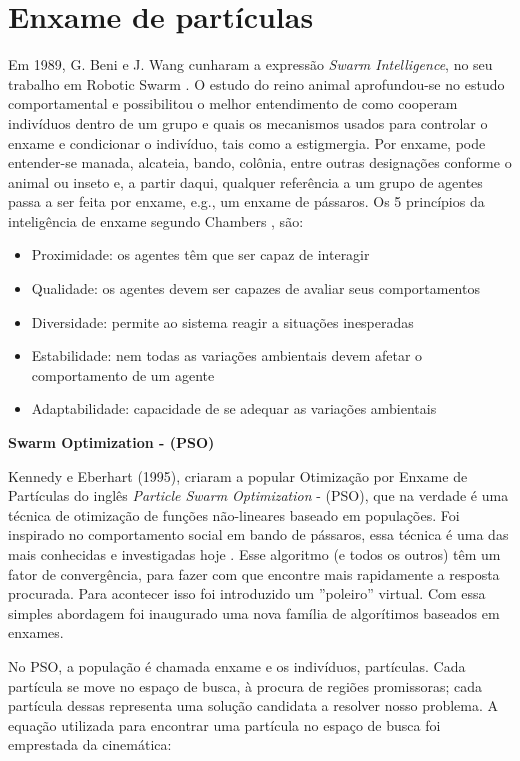 \documentclass[conference,compsoc]{IEEEtran}
\begin{document}
\section{Enxame de partículas}\label{arte:enxames}

Em 1989, G. Beni e J. Wang cunharam a expressão \textit{Swarm Intelligence}, no seu
trabalho em Robotic Swarm \cite{SRobotics}. O estudo do reino animal aprofundou-se no estudo
comportamental e possibilitou o melhor entendimento de como cooperam indivíduos dentro de um grupo e
quais os mecanismos usados para controlar o enxame e condicionar o indivíduo, tais como a estigmergia. 
Por enxame, pode entender-se manada, alcateia, bando, colônia, entre outras designações conforme o animal 
ou inseto e, a partir daqui, qualquer referência a um grupo de agentes passa a ser feita por enxame, e.g., 
um enxame de pássaros. Os 5 princípios da inteligência de enxame segundo  Chambers \cite{chambers2014computer}, são:
\begin{itemize}
	\item{Proximidade: os agentes têm que ser capaz de interagir}
	\item{Qualidade: os agentes devem ser capazes de avaliar seus comportamentos}
	\item{Diversidade: permite ao sistema reagir a situações inesperadas}
	\item{Estabilidade: nem todas as variações ambientais devem afetar o comportamento de um agente}
	\item{Adaptabilidade: capacidade de se adequar as variações ambientais}
\end{itemize}

\vspace{0.3cm}
\textbf{Swarm Optimization - (PSO)}
\vspace{0.1cm}

Kennedy e Eberhart (1995), criaram a popular Otimização por Enxame de Partículas do inglês \textit{Particle Swarm Optimization} - (PSO), 
que na verdade é uma técnica de otimização de funções não-lineares baseado em populações. Foi inspirado no comportamento
social em bando de pássaros, essa técnica é uma das mais conhecidas e investigadas hoje \cite{Kennedy1995}.
Esse algoritmo (e todos os outros) têm um fator de convergência, para fazer com que encontre mais rapidamente a resposta procurada.
Para acontecer isso foi introduzido um ''poleiro'' virtual. Com essa simples abordagem foi inaugurado uma nova
família de algorítimos baseados em enxames. 

No PSO, a população é chamada enxame e os indivíduos, partículas. Cada partícula se move no espaço de busca, 
à procura de regiões promissoras; cada partícula dessas representa uma solução candidata a resolver nosso problema.
A equação utilizada para encontrar uma partícula no espaço de busca foi emprestada da cinemática:
\end{document}
